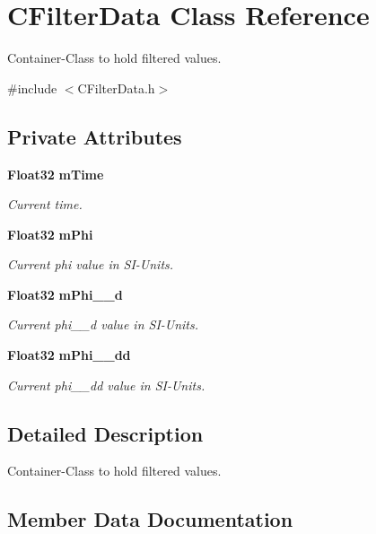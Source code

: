 \section{C\-Filter\-Data Class Reference}
\label{classCFilterData}


Container-\/\-Class to hold filtered values.  




{\ttfamily \#include $<$C\-Filter\-Data.\-h$>$}

\subsection*{Private Attributes}
\begin{DoxyCompactItemize}
\item 
{\bf Float32} {\bf m\-Time}
\begin{DoxyCompactList}\small\item\em Current time. \end{DoxyCompactList}\item 
{\bf Float32} {\bf m\-Phi}
\begin{DoxyCompactList}\small\item\em Current phi value in S\-I-\/\-Units. \end{DoxyCompactList}\item 
{\bf Float32} {\bf m\-Phi\-\_\-\-\_\-d}
\begin{DoxyCompactList}\small\item\em Current phi\-\_\-\-\_\-d value in S\-I-\/\-Units. \end{DoxyCompactList}\item 
{\bf Float32} {\bf m\-Phi\-\_\-\-\_\-dd}
\begin{DoxyCompactList}\small\item\em Current phi\-\_\-\-\_\-dd value in S\-I-\/\-Units. \end{DoxyCompactList}\end{DoxyCompactItemize}


\subsection{Detailed Description}
Container-\/\-Class to hold filtered values. 

\subsection{Member Data Documentation}
